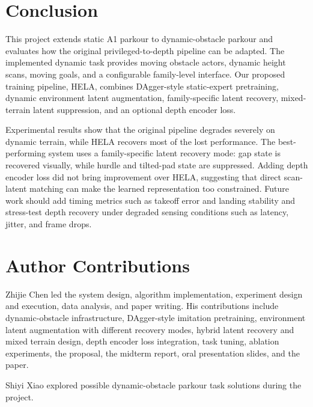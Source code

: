 \documentclass[conference]{IEEEtran}
\begin{document}
\section{Conclusion}
This project extends static A1 parkour to dynamic-obstacle parkour and evaluates how the original privileged-to-depth pipeline can be adapted. The implemented dynamic task provides moving obstacle actors, dynamic height scans, moving goals, and a configurable family-level interface. Our proposed training pipeline, HELA, combines DAgger-style static-expert pretraining, dynamic environment latent augmentation, family-specific latent recovery, mixed-terrain latent suppression, and an optional depth encoder loss.

Experimental results show that the original pipeline degrades severely on dynamic terrain, while HELA recovers most of the lost performance. The best-performing system uses a family-specific latent recovery mode: gap state is recovered visually, while hurdle and tilted-pad state are suppressed. Adding depth encoder loss did not bring improvement over HELA, suggesting that direct scan-latent matching can make the learned representation too constrained. Future work should add timing metrics such as takeoff error and landing stability and stress-test depth recovery under degraded sensing conditions such as latency, jitter, and frame drops.




\appendices
\section{Author Contributions}
Zhijie Chen led the system design, algorithm implementation, experiment design and execution, data analysis, and paper writing. His contributions include dynamic-obstacle infrastructure, DAgger-style imitation pretraining, environment latent augmentation with different recovery modes, hybrid latent recovery and mixed terrain design, depth encoder loss integration, task tuning, ablation experiments, the proposal, the midterm report, oral presentation slides, and the paper.

Shiyi Xiao explored possible dynamic-obstacle parkour task solutions during the project.
\end{document}
